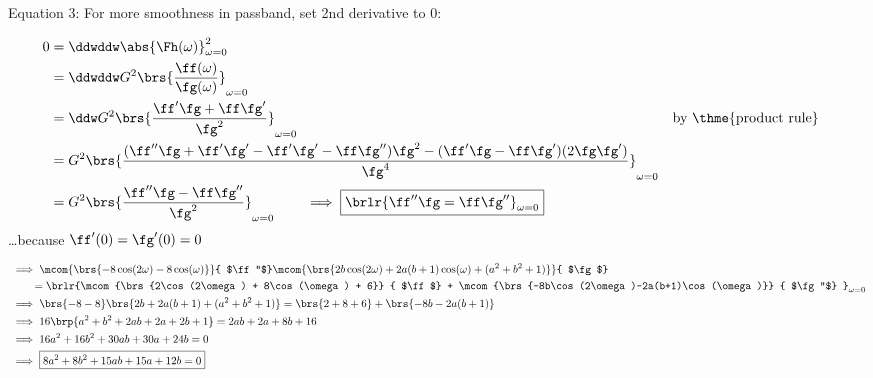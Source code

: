 Equation 3: For more smoothness in passband, set 2nd derivative to 0:
{\begin{align*}
  0 &= \ddwddw\abs{\Fh(\omega)}^2_{\omega=0}
  \\&= \ddwddw G^2 \brs{\frac{\ff(\omega)}
                             {\fg(\omega)}
                       }_{\omega=0}
  \\&= \ddw    G^2 \brs{\frac{\ff'\fg + \ff \fg'}
                             {\fg^2}
                       }_{\omega=0}
    && \text{by \thme{product rule}}
  \\&=         G^2 \brs{\frac{(\ff''\fg + \ff'\fg' - \ff'\fg' -\ff\fg'')\fg^2 - (\ff'\fg - \ff\fg')(2\fg\fg')}
                             {\fg^4}
                       }_{\omega=0}
  \\&=         G^2 \brs{\frac{\ff''\fg -\ff\fg''}
                             {\fg^2}
                       }_{\omega=0}
     \qquad \implies \boxed{\brlr{\ff''\fg = \ff\fg''}_{\omega=0}}
\end{align*}
\ldots because $\ff'(0) = \fg'(0) = 0$ %
 
{ \begin{align*}
  &\implies \mcom{\brs{-8\cos(2\omega)-8\cos(\omega)}}
                   { $\ff''$}
                    \mcom{\brs{2b\cos(2\omega)+2a(b+1)\cos(\omega)+(a^2+b^2+1)}}
                         { $\fg$}
              \\&\qquad= \brlr{\mcom{\brs{2\cos(2\omega) + 8\cos(\omega) + 6}}
                                    { $\ff$}
                  + \mcom{\brs{-8b\cos(2\omega)-2a(b+1)\cos(\omega)}}
                         { $\fg''$}
                   }_{\omega=0} 
  \\&\implies \brs{-8-8}        \brs{2b+2a(b+1)+(a^2+b^2+1)}
                = \brs{2 + 8 + 6} + \brs{-8b-2a(b+1)}
  \\&\implies 16\brp{a^2+b^2 +2ab + 2a + 2b + 1} = 2ab + 2a + 8b + 16
  \\&\implies 16a^2+ 16b^2 +30ab + 30a + 24b = 0
  \\&\implies \boxed{8a^2+ 8b^2 +15ab + 15a + 12b = 0}
\end{align*}}




}
